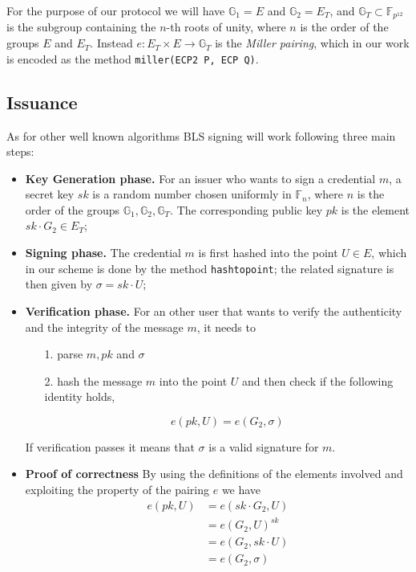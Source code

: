 For the purpose of our protocol we will have $\mathbb{G}_1 = E$ and
$\mathbb{G}_2 = E_T$, and $\mathbb{G}_T\subset \mathbb{F}_{p^{12}}$ is
the subgroup containing the $n$-th roots of unity, where $n$ is the
order of the groups $E$ and $E_T$. Instead $e: E_T \times E\to
\mathbb{G}_T$ is the \emph{Miller pairing}, which in our work is
encoded as the method \verb!miller(ECP2 P, ECP Q)!. \\


\subsection{Issuance} \label{issuance}

As for other well known algorithms BLS signing will work following
three main steps:
\begin{itemize}

\item \textbf{Key Generation phase.} For an issuer who wants to sign a
  credential $m$, a secret key $sk$ is a random number chosen
  uniformly in $\mathbb{F}_n$, where $n$ is the order of the groups
  $\mathbb{G}_1, \mathbb{G}_2, \mathbb{G}_T$. The corresponding public
  key $pk$ is the element $sk\cdot G_2\in E_T$;

\item \textbf{Signing phase.} The credential $m$ is first hashed into
  the point $U\in E$, which in our scheme is done by the method
  \verb!hashtopoint!; the related signature is then given by $\sigma =
  sk\cdot U$;

\item \textbf{Verification phase.} For an other user that wants to
  verify the authenticity and the integrity of the message $m$, it
  needs to

  \begin{itemize}

  \item [1.] parse $m, pk$ and $\sigma$

  \item [2.] hash the message $m$ into the point $U$ and then
    check if the following identity holds,

    \[
    e(pk,U) = e(G_2,\sigma)
    \]

  \end{itemize}
If verification passes it means that $\sigma$ is a valid signature for
$m$.
\item \textbf{Proof of correctness} By using the definitions of the
  elements involved and exploiting the property of the pairing $e$ we
  have
\[
\begin{split}
    e(pk,U) &= e(sk\cdot G_2, U) \\
            &= e(G_2,U)^{sk}\\
            &= e(G_2,sk\cdot U)\\
            &= e(G_2,\sigma)
\end{split}
\]

\end{itemize}

